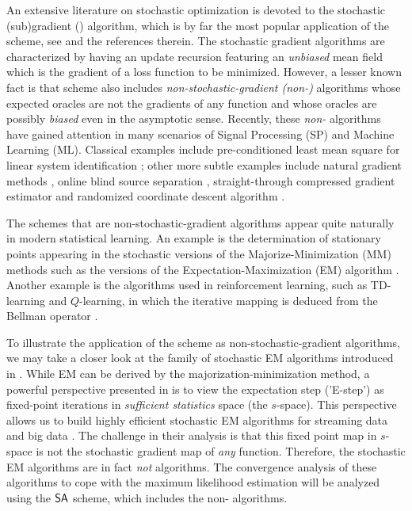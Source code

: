 \documentclass[10pt,twocolumn,twoside]{IEEEtran}
\begin{document}
An extensive literature on stochastic optimization is devoted to the stochastic (sub)gradient (\SG) algorithm, which is by far the most popular application of the {\SA} scheme, see \eg \cite{bottou2018optimization,cevher2014convex, lan2020first} and the references therein. The stochastic gradient algorithms are characterized by having an update recursion featuring an \emph{unbiased} mean field which is the gradient of a loss function to be minimized. However, a lesser known fact is that {\SA} scheme also includes \emph{non-stochastic-gradient (non-{\SG})} algorithms whose expected oracles are not the gradients of any function and whose oracles are possibly \emph{biased} even in the asymptotic sense. Recently, these \emph{non-\SG} algorithms have gained attention in many scenarios of Signal Processing (SP) and Machine Learning (ML).
Classical examples include pre-conditioned least mean square  for linear system identification \cite{kushner2003stochastic};
other more subtle examples include  natural gradient methods \cite{ren2021tensor,gunasekar2021mirrorless}, online blind source separation \cite{cichocki1994robust,cardoso1998blind,hyvarinen2000independent,cichocki2002adaptive}, straight-through compressed gradient estimator \cite{Courbariaux2015,shekhovtsov2021reintroducing} and randomized coordinate descent algorithm \cite{nutini2015coordinate}.

The {\SA} schemes that are non-stochastic-gradient algorithms appear quite naturally in modern statistical learning. 
An example is the determination of stationary points appearing in the stochastic versions of the Majorize-Minimization (MM) methods \cite{lange:2013,sun2016majorization} such as the {\SA} versions of the Expectation-Maximization (EM) algorithm \cite{delyon1999convergence,fort2021fast,karimi2019non}.
Another example is the algorithms used in reinforcement learning, such as TD-learning and $Q$-learning, in which the iterative mapping is deduced from the Bellman operator
\cite{sutton1988learning,sutton2018reinforcement,tsitsiklis1996analysis,karimi2019non}.

To illustrate the application of the {\SA} scheme as non-stochastic-gradient algorithms, we may take a closer look at the family of stochastic EM algorithms introduced in \cite{delyon1999convergence}.
While EM can be derived by the majorization-minimization method, a powerful perspective presented in \cite{delyon1999convergence} is to view the expectation step ('E-step') as fixed-point iterations in \emph{sufficient statistics} space (the $s$-space). This perspective allows us to build highly efficient stochastic EM algorithms for streaming data and big data \cite{cappe2009line,chen2018stochastic,karimi2019non,fort2021fast,fort2020stochastic}. The challenge in their analysis is that this fixed point map in $s$-space is not the stochastic gradient map of \emph{any} function. Therefore, the stochastic EM algorithms are in fact \emph{not}  {\SG} algorithms. The convergence analysis of these algorithms to cope with the maximum likelihood estimation will be analyzed using the $\textsf{SA}$ scheme, which includes the {non-\SG} algorithms.
\end{document}
